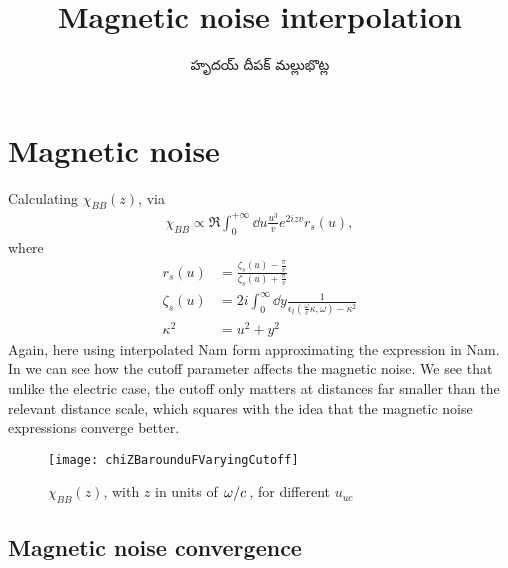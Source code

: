 \documentclass[../main.tex]{subfiles}
\title{Magnetic noise interpolation}
\author{\begin{telugu}హృదయ్ దీపక్ మల్లుభొట్ల\end{telugu}}
\date{}
\begin{document}
	\graphicspath{{\main/figures/}}

	\onlyinsubfile{\maketitle}

	\section{Magnetic noise} \label{sec:imn:intro}

	Calculating $\chi_{BB}(z)$, via
	\begin{align}
		\chi_{BB} \propto \Re \int_0^{+\infty} \dd{u} \frac{u^3}{v} e^{2 i z v} r_s(u),
	\end{align}
	where
	\begin{align}
		r_s(u) &= \frac{\zeta_s(u) - \frac{\pi}{v}}{\zeta_s(u) + \frac{\pi}{v}} \\
		\zeta_s(u) &= 2i \int_0^\infty \dd{y} \frac{1}{\epsilon_t(\frac{\omega}{c}\kappa, \omega) - \kappa^2} \\
		\kappa^2 &= u^2 + y^2
	\end{align}
	Again, here using interpolated Nam form approximating the expression in Nam\supercite{Nam1967}.
	In  we can see how the cutoff parameter affects the magnetic noise.
	We see that unlike the electric case, the cutoff only matters at distances far smaller than the relevant distance scale, which squares with the idea that the magnetic noise expressions converge better.
	\begin{figure}[htp]
		\centering
		\texttt{[image: chiZBarounduFVaryingCutoff]}
		\caption{$\chi_{BB}(z)$, with $z$ in units of $\flatfrac{\omega}{c}$, for different $u_{uc}$} \label{fig:cutoff}
	\end{figure}

	\subsection{Magnetic noise convergence} \label{subsec:magneticnoiseconvergence}
\end{document}
